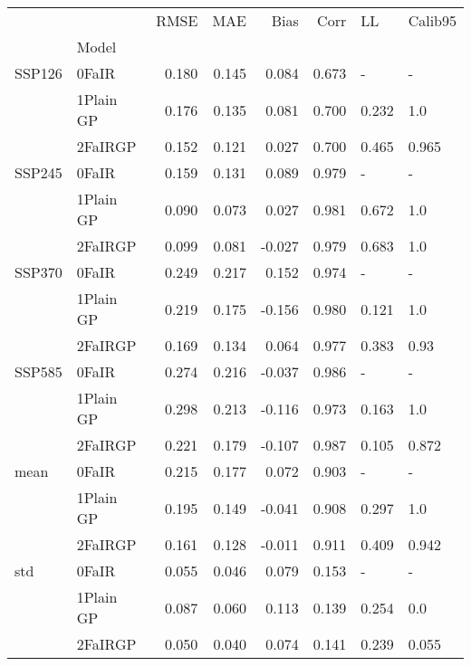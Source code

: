 \begin{tabular}{llrrrrll}
\toprule
    &         &   RMSE &    MAE &   Bias &   Corr &     LL & Calib95 \\
{} & Model &        &        &        &        &        &         \\
\midrule
SSP126 & 0FaIR &  0.180 &  0.145 &  0.084 &  0.673 &      - &       - \\
    & 1Plain GP &  0.176 &  0.135 &  0.081 &  0.700 &  0.232 &     1.0 \\
    & 2FaIRGP &  0.152 &  0.121 &  0.027 &  0.700 &  0.465 &   0.965 \\
SSP245 & 0FaIR &  0.159 &  0.131 &  0.089 &  0.979 &      - &       - \\
    & 1Plain GP &  0.090 &  0.073 &  0.027 &  0.981 &  0.672 &     1.0 \\
    & 2FaIRGP &  0.099 &  0.081 & -0.027 &  0.979 &  0.683 &     1.0 \\
SSP370 & 0FaIR &  0.249 &  0.217 &  0.152 &  0.974 &      - &       - \\
    & 1Plain GP &  0.219 &  0.175 & -0.156 &  0.980 &  0.121 &     1.0 \\
    & 2FaIRGP &  0.169 &  0.134 &  0.064 &  0.977 &  0.383 &    0.93 \\
SSP585 & 0FaIR &  0.274 &  0.216 & -0.037 &  0.986 &      - &       - \\
    & 1Plain GP &  0.298 &  0.213 & -0.116 &  0.973 &  0.163 &     1.0 \\
    & 2FaIRGP &  0.221 &  0.179 & -0.107 &  0.987 &  0.105 &   0.872 \\
mean & 0FaIR &  0.215 &  0.177 &  0.072 &  0.903 &      - &       - \\
    & 1Plain GP &  0.195 &  0.149 & -0.041 &  0.908 &  0.297 &     1.0 \\
    & 2FaIRGP &  0.161 &  0.128 & -0.011 &  0.911 &  0.409 &   0.942 \\
std & 0FaIR &  0.055 &  0.046 &  0.079 &  0.153 &      - &       - \\
    & 1Plain GP &  0.087 &  0.060 &  0.113 &  0.139 &  0.254 &     0.0 \\
    & 2FaIRGP &  0.050 &  0.040 &  0.074 &  0.141 &  0.239 &   0.055 \\
\bottomrule
\end{tabular}
